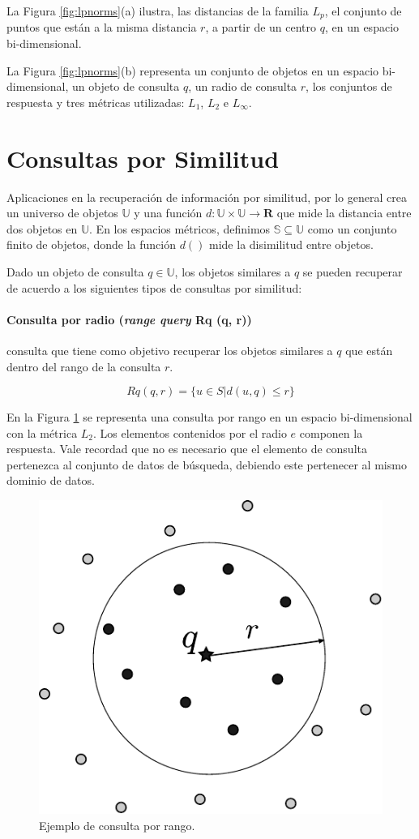 La Figura \ref{fig:lpnorms}(a)  ilustra,  las distancias de la familia  $L_p$, el conjunto de puntos que están a la misma distancia $r$, a partir de un centro $q$, en un  espacio bi-dimensional.

La Figura \ref{fig:lpnorms}(b) representa un conjunto de objetos en un  espacio bi-dimensional, un objeto de consulta $q$, un radio de consulta $r$, los conjuntos de respuesta y tres métricas utilizadas: $L_1$, $L_2$ e $L_{\infty}$.

\section{Consultas por Similitud}\label{sec:consultas-similaridade}

Aplicaciones en la recuperación de información por similitud, por lo general crea un universo de objetos $\mathbb{U}$  y una función $d: \mathbb{U} \times \mathbb{U} \rightarrow \mathbf{R} $ que mide la distancia entre dos objetos en $\mathbb{U} $. En los espacios métricos, definimos $\mathbb{S} \subseteq \mathbb{U} $ como un conjunto finito de objetos, donde la función $d()$ mide la disimilitud entre objetos.

Dado un objeto de consulta $q \in \mathbb{U} $,  los objetos similares a $q$  se pueden recuperar de acuerdo a los siguientes tipos de consultas por similitud:

\paragraph{Consulta por radio (\textit{range query} Rq (q, r))} consulta que tiene como objetivo recuperar los objetos similares a $q$ que están dentro del rango de la consulta $r$.

\begin{equation}
    Rq(q, r) = \{ u \in S | d(u, q) \leq r \}
\end{equation}

En la Figura \ref{fig:rangeQuery} se representa una consulta por rango en un espacio bi-dimensional con la métrica $L_2$. Los elementos contenidos por el radio $e$ componen la respuesta. Vale recordad que no es necesario que el elemento de consulta pertenezca al conjunto de datos de búsqueda, debiendo este pertenecer al mismo dominio de datos.

\begin{figure}[htp]
\centering
\includegraphics[width=0.3\columnwidth]{chapter2/range_query.pdf}
\caption{Ejemplo de consulta por rango.}
\label{fig:rangeQuery}
\end{figure}


